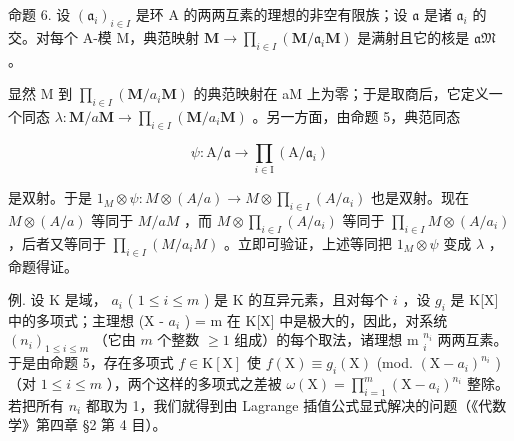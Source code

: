 命题 6. 设 \((\mathfrak{a}_i)_{i\in I}\) 是环 A 的两两互素的理想的非空有限族；设 \(\mathfrak{a}\) 是诸 \(\mathfrak{a}_i\) 的交。对每个 A-模 M，典范映射 \(\mathbf{M} \to \prod_{i\in I} (\mathbf{M} / \mathfrak{a}_i\mathbf{M})\) 是满射且它的核是 \(\mathfrak{aM}\) 。

显然 M 到 \(\prod_{i\in I}(\mathbf{M} / a_i\mathbf{M})\) 的典范映射在 aM 上为零；于是取商后，它定义一个同态 \(\lambda : \mathbf{M} / a\mathbf{M}\to \prod_{i\in I}(\mathbf{M} / a_i\mathbf{M})\) 。另一方面，由命题 5，典范同态

\[
\psi \colon \mathrm{A} / \mathfrak {a} \rightarrow \prod_ {i \in \mathrm{I}} (\mathrm{A} / \mathfrak {a} _ {i})
\]

是双射。于是 \(1_{M} \otimes \psi: M \otimes (A/a) \to M \otimes \prod_{i \in I} (A/a_i)\) 也是双射。现在 \(M \otimes (A/a)\) 等同于 \(M/aM\) ，而 \(M \otimes \prod_{i \in I} (A/a_i)\) 等同于 \(\prod_{i \in I} M \otimes (A/a_i)\) ，后者又等同于 \(\prod_{i \in I} (M/a_iM)\) 。立即可验证，上述等同把 \(1_M \otimes \psi\) 变成 \(\lambda\) ，命题得证。

例. 设 K 是域， \(a_{i}\) ( \(1 \leqslant i \leqslant m\) ) 是 K 的互异元素，且对每个 \(i\) ，设 \(g_{i}\) 是 K{[}X{]} 中的多项式；主理想 (X - \(a_{i}\) ) = m 在 K{[}X{]} 中是极大的，因此，对系统 \((n_{i})_{1 \leqslant i \leqslant m}\) （它由 \(m\) 个整数 \(\geqslant 1\) 组成）的每个取法，诸理想 m \(_{i}^{n_{i}}\) 两两互素。于是由命题 5，存在多项式 \(f \in \mathrm{K}[\mathrm{X}]\) 使 \(f(\mathrm{X}) \equiv g_{i}(\mathrm{X})\) (mod. \((\mathrm{X} - a_{i})^{n_{i}}\) ) （对 \(1 \leqslant i \leqslant m\) ），两个这样的多项式之差被 \(\omega(\mathrm{X}) = \prod_{i=1}^{m} (\mathrm{X} - a_{i})^{n_{i}}\) 整除。若把所有 \(n_{i}\) 都取为 1，我们就得到由 Lagrange 插值公式显式解决的问题（《代数学》第四章 §2 第 4 目）。

